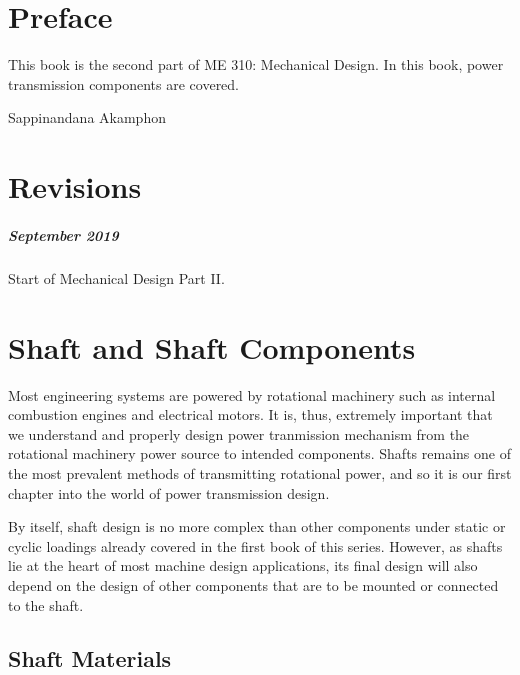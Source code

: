 \documentclass[
10pt,
a4paper,
openany,
svgnames,
]{book}
\begin{document}
\restoregeometry%
\nopagecolor%

\chapter*{Preface}

This book is the second part of ME 310: Mechanical Design. In this book, power transmission components are covered.

\vspace{2cm}\hspace{10cm} Sappinandana Akamphon

\chapter*{Revisions}

\paragraph{September 2019}

Start of Mechanical Design Part II.\

\tableofcontents

\listoffigures

\listoftables

\mainmatter{}

\chapter{Shaft and Shaft Components}

Most engineering systems are powered by rotational machinery such as internal combustion engines and electrical motors. It is, thus, extremely important that we understand and properly design power tranmission mechanism from the rotational machinery power source to intended components. Shafts remains one of the most prevalent methods of transmitting rotational power, and so it is our first chapter into the world of power transmission design.

By itself, shaft design is no more complex than other components under static or cyclic loadings already covered in the first book of this series. However, as shafts lie at the heart of most machine design applications, its final design will also depend on the design of other components that are to be mounted or connected to the shaft.

\section{Shaft Materials}
\end{document}
